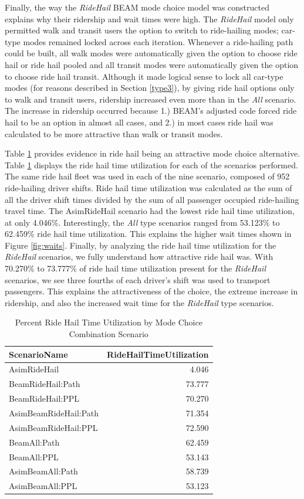 \documentclass[fancy, masters]{byuthesis}
\begin{document}
Finally, the way the \emph{RideHail} BEAM mode choice model was constructed explains why their ridership and wait times were high. The \emph{RideHail} model only permitted walk and transit users the option to switch to ride-hailing modes; car-type modes remained locked across each iteration. Whenever a ride-hailing path could be built, all walk modes were automatically given the option to choose ride hail or ride hail pooled and all transit modes were automatically given the option to choose ride hail transit. Although it made logical sense to lock all car-type modes (for reasons described in Section \ref{type3}), by giving ride hail options only to walk and transit users, ridership increased even more than in the \emph{All} scenario. The increase in ridership occurred because 1.) BEAM's adjusted code forced ride hail to be an option in almost all cases, and 2.) in most cases ride hail was calculated to be more attractive than walk or transit modes.

Table \ref{tab:timeutil} provides evidence in ride hail being an attractive mode choice alternative. Table \ref{tab:timeutil} displays the ride hail time utilization for each of the scenarios performed. The same ride hail fleet was used in each of the nine scenario, composed of 952 ride-hailing driver shifts. Ride hail time utilization was calculated as the sum of all the driver shift times divided by the sum of all passenger occupied ride-hailing travel time. The AsimRideHail scenario had the lowest ride hail time utilization, at only 4.046\%. Interestingly, the \emph{All} type scenarios ranged from 53.123\% to 62.459\% ride hail time utilization. This explains the higher wait times shown in Figure \ref{fig:waits}. Finally, by analyzing the ride hail time utilization for the \emph{RideHail} scenarios, we fully understand how attractive ride hail was. With 70.270\% to 73.777\% of ride hail time utilization present for the \emph{RideHail} scenarios, we see three fourths of each driver's shift was used to transport passengers. This explains the attractiveness of the choice, the extreme increase in ridership, and also the increased wait time for the \emph{RideHail} type scenarios.

\begin{table}

\caption{\label{tab:timeutil}Percent Ride Hail Time Utilization by Mode Choice Combination Scenario}
\centering
\begin{tabular}[t]{lr}
\toprule
ScenarioName & RideHailTimeUtilization\\
\midrule
AsimRideHail & 4.046\\
BeamRideHail:Path & 73.777\\
BeamRideHail:PPL & 70.270\\
AsimBeamRideHail:Path & 71.354\\
AsimBeamRideHail:PPL & 72.590\\
\addlinespace
BeamAll:Path & 62.459\\
BeamAll:PPL & 53.143\\
AsimBeamAll:Path & 58.739\\
AsimBeamAll:PPL & 53.123\\
\bottomrule
\end{tabular}
\end{table}
\end{document}
